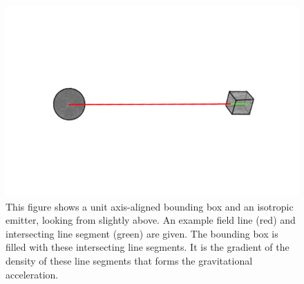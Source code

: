 \documentclass[12pt]{article}
\begin{document}
\begin{figure} 
\centering
\label{fig1}
  \includegraphics[width = 7 in]{AABB.png}
  \caption{
This figure shows a unit axis-aligned bounding box and an isotropic emitter, looking from slightly above.
An example field line (red) and intersecting line segment (green) are given.
The bounding box is filled with these intersecting line segments.
It is the gradient of the density of these line segments that forms the gravitational acceleration.
}
\end{figure}
\end{document}
